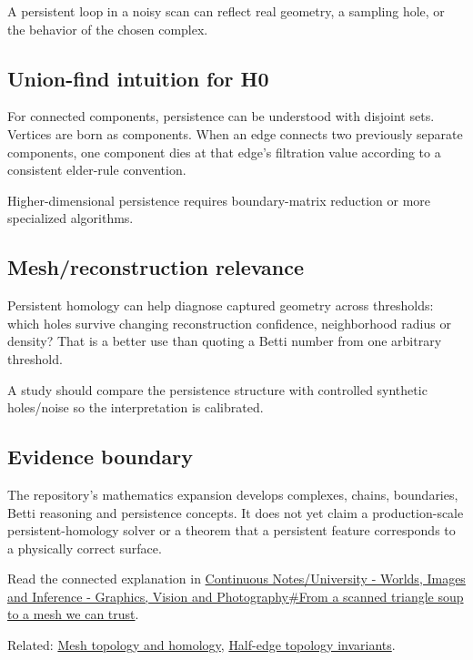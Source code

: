 A persistent loop in a noisy scan can reflect real geometry, a sampling hole, or the behavior of the chosen complex.

\subsection{Union-find intuition for H0}\label{appendix-e4d8ed8d6787-union-find-intuition-for-h0}

\hypertarget{appendix-e4d8ed8d6787-union-find-intuition-for-h0}{}

For connected components, persistence can be understood with disjoint sets. Vertices are born as components. When an edge connects two previously separate components, one component dies at that edge's filtration value according to a consistent elder-rule convention.

Higher-dimensional persistence requires boundary-matrix reduction or more specialized algorithms.

\subsection{Mesh/reconstruction relevance}\label{appendix-e4d8ed8d6787-meshreconstruction-relevance}

\hypertarget{appendix-e4d8ed8d6787-meshreconstruction-relevance}{}

Persistent homology can help diagnose captured geometry across thresholds: which holes survive changing reconstruction confidence, neighborhood radius or density? That is a better use than quoting a Betti number from one arbitrary threshold.

A study should compare the persistence structure with controlled synthetic holes/noise so the interpretation is calibrated.

\subsection{Evidence boundary}\label{appendix-e4d8ed8d6787-evidence-boundary}

\hypertarget{appendix-e4d8ed8d6787-evidence-boundary}{}

The repository's mathematics expansion develops complexes, chains, boundaries, Betti reasoning and persistence concepts. It does not yet claim a production-scale persistent-homology solver or a theorem that a persistent feature corresponds to a physically correct surface.

Read the connected explanation in \hyperref[03-visual-computing-i-ch002-from-a-scanned-triangle-soup-to-a-mesh-we-can-trust]{Continuous Notes/University - Worlds, Images and Inference - Graphics, Vision and Photography\#From a scanned triangle soup to a mesh we can trust}.

Related: \hyperref[appendix-e38976cbbf86]{Mesh topology and homology}, \hyperref[appendix-faac749c9cdd]{Half-edge topology invariants}.
